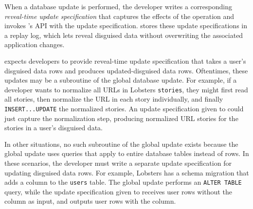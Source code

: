 When a database update is performed, the developer writes a corresponding
\emph{reveal-time update specification} that captures the effects of the operation and
invokes \sys's API with the update specification.
\sys stores these update specifications in a replay log, which lets \sys reveal
disguised data without overwriting the associated application changes.
%
%

%

%
\sys expects developers to provide reveal-time update specification that takes
a user's disguised data rows and produces updated-disguised data rows.
%
Oftentimes, these updates may be a subroutine of the global
database update. 
%
For example, if a developer wants to normalize all URLs in Lobsters
\texttt{stories}, they might first read all stories, then normalize the URL in
each story individually, and finally \texttt{INSERT...UPDATE} the normalized
stories. 
%
An update specification given to \sys could just capture the normalization step,
producing normalized URL stories for the stories in a user's disguised data.
%

%
In other situations, no such subroutine of the global update exists because the
global update uses queries that apply to entire database tables instead of rows.
In these scenarios, the developer must write a separate update specification for
updating disguised data rows.
%
For example, Lobsters has a schema migration that adds a column to the
\texttt{users} table.  The global update performs an \texttt{ALTER TABLE}
query, while the update specification given to \sys receives user rows without the column
as input, and outputs user rows with the column.
%

